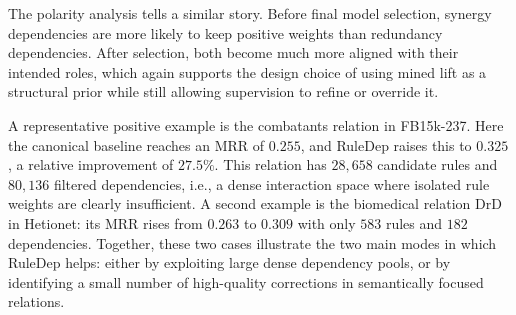 The polarity analysis tells a similar story. Before final model selection, synergy dependencies are more likely to keep positive weights than redundancy dependencies. After selection, both become much more aligned with their intended roles, which again supports the design choice of using mined lift as a structural prior while still allowing supervision to refine or override it.


A representative positive example is the combatants relation in FB15k-237. Here the canonical baseline reaches an MRR of $0.255$, and RuleDep raises this to $0.325$, a relative improvement of $27.5\%$. This relation has $28{,}658$ candidate rules and $80{,}136$ filtered dependencies, i.e., a dense interaction space where isolated rule weights are clearly insufficient. A second example is the biomedical relation DrD in Hetionet: its MRR rises from $0.263$ to $0.309$ with only $583$ rules and $182$ dependencies. Together, these two cases illustrate the two main modes in which RuleDep helps: either by exploiting large dense dependency pools, or by identifying a small number of high-quality corrections in semantically focused relations.


